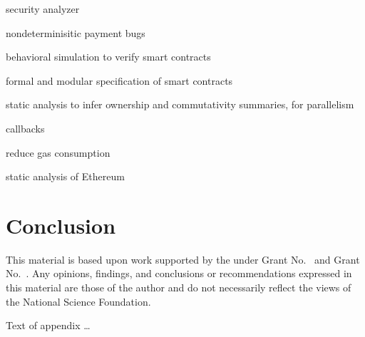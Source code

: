 \documentclass[acmsmall,review,anonymous]{acmart}\settopmatter{printfolios=true,printccs=false,printacmref=false}
\begin{document}
security analyzer \cite{DBLP:conf/pldi/BrentGLSS20}

nondeterminisitic payment bugs \cite{DBLP:journals/pacmpl/WangZS19}

behavioral simulation to verify smart contracts \cite{DBLP:conf/pldi/BeillahiCEE20}

formal and modular specification of smart contracts \cite{DBLP:journals/pacmpl/BramEMSS21}

static analysis to infer ownership and commutativity summaries, for parallelism
\cite{DBLP:conf/pldi/Pirlea0S21}

callbacks \cite{DBLP:journals/pacmpl/AlbertGRRRS20, DBLP:journals/pacmpl/GrossmanAGMRSZ18}

reduce gas consumption \cite{DBLP:journals/pacmpl/GrechKJBSS18}

static analysis of Ethereum \cite{DBLP:journals/pacmpl/SmaragdakisGLTT21}

\section{Conclusion}


\begin{acks}                            %
  This material is based upon work supported by the
   under Grant
  No.~ and Grant
  No.~.  Any opinions, findings, and
  conclusions or recommendations expressed in this material are those
  of the author and do not necessarily reflect the views of the
  National Science Foundation.
\end{acks}






Text of appendix \ldots
\end{document}
